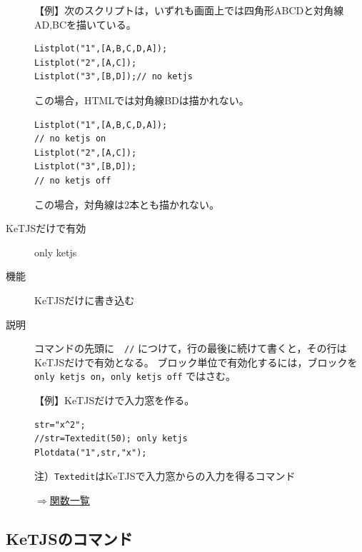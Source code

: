 \documentclass[papersize,a4paper,12pt,uplatex]{jsarticle}
\begin{document}
\begin{description}
【例】次のスクリプトは，いずれも画面上では四角形ABCDと対角線AD,BCを描いている。

\begin{verbatim}
Listplot("1",[A,B,C,D,A]);
Listplot("2",[A,C]);
Listplot("3",[B,D]);// no ketjs
\end{verbatim}

この場合，HTMLでは対角線BDは描かれない。

\begin{verbatim}
Listplot("1",[A,B,C,D,A]);
// no ketjs on
Listplot("2",[A,C]);
Listplot("3",[B,D]);
// no ketjs off
\end{verbatim}

この場合，対角線は2本とも描かれない。



\vspace{\baselineskip}
\hypertarget{setketcindy}{}
\item[KeTJSだけで有効] only ketjs
\item[機能] KeTJSだけに書き込む
\item[説明] コマンドの先頭に　\verb|//| につけて，行の最後に続けて書くと，その行はKeTJSだけで有効となる。
ブロック単位で有効化するには，ブロックを \verb|only ketjs on|，\verb|only ketjs off| ではさむ。

【例】KeTJSだけで入力窓を作る。

\begin{verbatim}
str="x^2";
//str=Textedit(50); only ketjs
Plotdata("1",str,"x");
\end{verbatim}

注）\verb|Textedit|はKeTJSで入力窓からの入力を得るコマンド

\begin{flushright} \hyperlink{functionlist}{$\Rightarrow$関数一覧}\end{flushright}

\end{description}



\subsection{KeTJSのコマンド}
\end{document}
